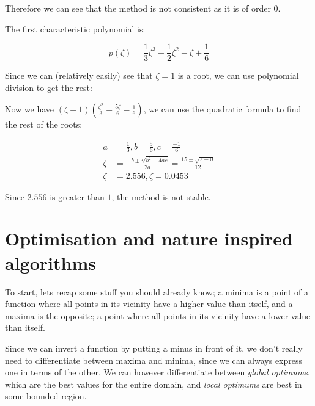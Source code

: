 \begin{description}
      Therefore we can see that the method is not consistent as it is
      of order $0$.

      The first characteristic polynomial is:

      \[
        p(\zeta) = \frac{1}{3}\zeta^3 + \frac{1}{2}\zeta^2 - \zeta + \frac{1}{6}
      \]

      Since we can (relatively easily) see that $\zeta = 1$ is a root,
      we can use polynomial division to get the rest:

      \begin{center}
      \end{center}
      
      Now we have $(\zeta - 1)\left(\frac{\zeta^2}{3} + \frac{5\zeta}{6} -
      \frac{1}{6}\right)$, we can use the quadratic formula to find the rest
      of the roots:

      \[
      \begin{split}
        a &= \frac{1}{3}, b = \frac{5}{6}, c = \frac{-1}{6}\\
        \zeta &= \frac{-b \pm\sqrt{b^2 - 4ac}}{2a} = \frac{15 \pm
          \sqrt{2-0}}{12}\\
        \zeta &= 2.556, \zeta = 0.0453
      \end{split}
      \]

      Since $2.556$ is greater than $1$, the method is not stable.

\end{description}


\section{Optimisation and nature inspired algorithms}

To start, lets recap some stuff you should already know; a minima is a
point of a function where all points in its vicinity have a higher
value than itself, and a maxima is the opposite; a point where all
points in its vicinity have a lower value than itself.

Since we can invert a function by putting a minus in front of it, we
don't really need to differentiate between maxima and minima, since we
can always express one in terms of the other. We can however
differentiate between \textit{global optimums}, which are the best
values for the entire domain, and \textit{local optimums} are best in
some bounded region.

